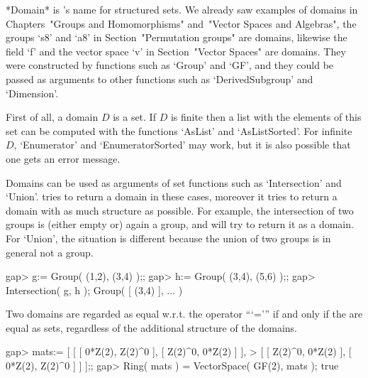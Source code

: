 


*Domain* is {\GAP}'s name for structured sets.
We already saw examples of domains in Chapters~"Groups and Homomorphisms"
and~"Vector Spaces and Algebras",
the groups `s8' and `a8' in Section~"Permutation groups" are domains,
likewise the field `f' and the vector space `v' in
Section~"Vector Spaces" are domains.
They were constructed by functions such as `Group' and `GF',
and they could be passed as arguments to other functions such as
`DerivedSubgroup' and `Dimension'.



First of all, a domain $D$ is a set.
If $D$ is finite then a list with the elements of this set can be
computed with the functions `AsList' and `AsListSorted'.
For infinite $D$, `Enumerator' and `EnumeratorSorted' may work,
but it is also possible that one gets an error message.

Domains can be used as arguments of set functions such as `Intersection'
and `Union'.
{\GAP} tries to return a domain in these cases,
moreover it tries to return a domain with as much structure as possible.
For example, the intersection of two groups is (either empty or) again a
group, and {\GAP} will try to return it as a domain.
For `Union', the situation is different because the union of two groups
is in general not a group.

\beginexample
    gap> g:= Group( (1,2), (3,4) );;
    gap> h:= Group( (3,4), (5,6) );;
    gap> Intersection( g, h );
    Group( [ (3,4) ], ... )
\endexample

Two domains are regarded as equal w.r.t. the operator ```=''' if and only
if the are equal as sets, regardless of the additional structure of the
domains.

\beginexample
    gap> mats:= [ [ [ 0*Z(2), Z(2)^0 ], [ Z(2)^0, 0*Z(2) ] ],
    >             [ [ Z(2)^0, 0*Z(2) ], [ 0*Z(2), Z(2)^0 ] ] ];;
    gap> Ring( mats ) = VectorSpace( GF(2), mats );
    true
\endexample

